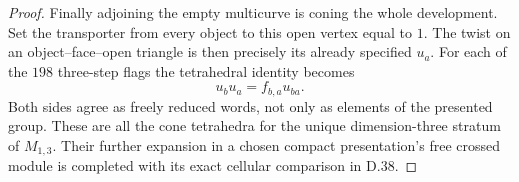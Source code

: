 \begin{proof}
Finally adjoining the empty multicurve is coning the
whole development.  Set the transporter from every
object to this open vertex equal to $1$.  The twist
on an object--face--open triangle is then precisely
its already specified $u_a$.  For each of the $198$
three-step flags the tetrahedral identity becomes
\[
                       u_bu_a=f_{b,a}u_{ba}.
\]
Both sides agree as freely reduced words, not only as
elements of the presented group.  These are all the
cone tetrahedra for the unique dimension-three
stratum of $M_{1,3}$.  Their further expansion in a
chosen compact presentation's free crossed module
is completed with its exact cellular comparison in D.38.
\end{proof}

